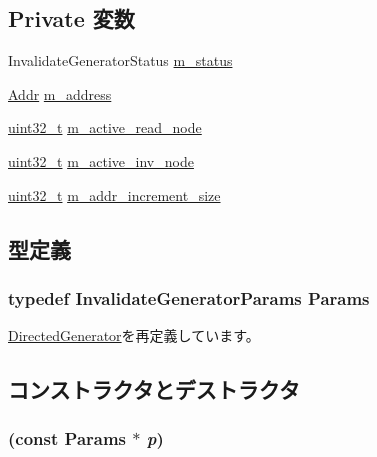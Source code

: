 \subsection*{Private 変数}
\begin{DoxyCompactItemize}
\item 
InvalidateGeneratorStatus \hyperlink{classInvalidateGenerator_a81c972f519d92e29514aaf7c760f38c5}{m\_\-status}
\item 
\hyperlink{base_2types_8hh_af1bb03d6a4ee096394a6749f0a169232}{Addr} \hyperlink{classInvalidateGenerator_aae7af981b728cf3cdda1dd5cf218711a}{m\_\-address}
\item 
\hyperlink{Type_8hh_a435d1572bf3f880d55459d9805097f62}{uint32\_\-t} \hyperlink{classInvalidateGenerator_a7d86dfe779b84de4ee0d62fb99dcb366}{m\_\-active\_\-read\_\-node}
\item 
\hyperlink{Type_8hh_a435d1572bf3f880d55459d9805097f62}{uint32\_\-t} \hyperlink{classInvalidateGenerator_a70d8bdfd0b821d91d725107146f989ad}{m\_\-active\_\-inv\_\-node}
\item 
\hyperlink{Type_8hh_a435d1572bf3f880d55459d9805097f62}{uint32\_\-t} \hyperlink{classInvalidateGenerator_a5953e604e2b5ee3378b20744144b9fda}{m\_\-addr\_\-increment\_\-size}
\end{DoxyCompactItemize}


\subsection{型定義}
\hypertarget{classInvalidateGenerator_ad11a79a813ce545d94f4464bebc395eb}{
\subsubsection[{Params}]{\setlength{\rightskip}{0pt plus 5cm}typedef InvalidateGeneratorParams {\bf Params}}}
\label{classInvalidateGenerator_ad11a79a813ce545d94f4464bebc395eb}


\hyperlink{classDirectedGenerator_ac723463fca65df4ca9fb4e67caddf417}{DirectedGenerator}を再定義しています。

\subsection{コンストラクタとデストラクタ}
\hypertarget{classInvalidateGenerator_a84e8459852f9bb78ad76461064c5478c}{
\subsubsection[{InvalidateGenerator}]{ (const {\bf Params} $\ast$ {\em p})}}
\label{classInvalidateGenerator_a84e8459852f9bb78ad76461064c5478c}



